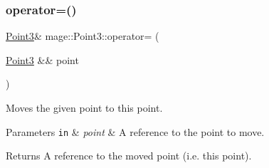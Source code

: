 \subsubsection{\texorpdfstring{operator=()}{operator=()}\hspace{0.1cm}{\footnotesize\ttfamily [2/2]}}
{\footnotesize\ttfamily \hyperlink{structmage_1_1_point3}{Point3}\& mage\+::\+Point3\+::operator= (\begin{DoxyParamCaption}\item[{\hyperlink{structmage_1_1_point3}{Point3} \&\&}]{point }\end{DoxyParamCaption})\hspace{0.3cm}{\ttfamily [default]}}

Moves the given point to this point.


\begin{DoxyParams}[1]{Parameters}
\mbox{\tt in}  & {\em point} & A reference to the point to move. \\
\hline
\end{DoxyParams}
\begin{DoxyReturn}{Returns}
A reference to the moved point (i.\+e. this point). 
\end{DoxyReturn}

